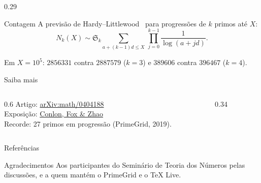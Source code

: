 \documentclass[final]{beamer}
\begin{document}
\begin{frame}[t]
\begin{columns}[T]
  \begin{column}{0.29\paperwidth}
    \begin{block}{Contagem}
      A previsão de Hardy--Littlewood~\cite{hardylittlewood1923} para progressões de $k$ primos até $X$:
      \begin{equation*}
        N_k(X) \sim \mathfrak{S}_k \sum_{a+(k-1)d \le X} \, \prod_{j=0}^{k-1} \frac{1}{\log(a+jd)} .
      \end{equation*}
      Em $X = 10^5$: $\num{2856331}$ contra $\num{2887579}$ ($k=3$) e $\num{389606}$ contra $\num{396467}$ ($k=4$).
    \end{block}
    \begin{block}{Saiba mais}
      \begin{columns}[c]
        \begin{column}{0.6\linewidth}
          Artigo: \href{https://arxiv.org/abs/math/0404188}{arXiv:math/0404188}\\[0.3cm]
          Exposição: \href{https://doi.org/10.4171/EMSS/6}{Conlon, Fox \& Zhao}~\cite{conlon2014}\\[0.3cm]
          Recorde: 27 primos em progressão (PrimeGrid, 2019).
        \end{column}
        \begin{column}{0.34\linewidth}
          {\color{lsPrimary}}
        \end{column}
      \end{columns}
    \end{block}
    \begin{block}{Referências}
      \nocite{vandercorput1939,furstenberg1977,gowers2001,green2010linear}
      \printbibliography[heading=none]
    \end{block}
    \begin{block}{Agradecimentos}
      Aos participantes do Seminário de Teoria dos Números pelas discussões, e a quem mantém o PrimeGrid e o TeX Live.
    \end{block}
  \end{column}
\end{columns}

\end{frame}
\end{document}
